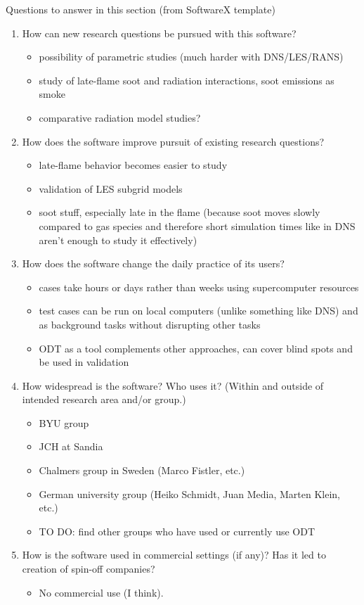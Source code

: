 \documentclass[preprint,12pt, a4paper]{elsarticle}
\begin{document}
Questions to answer in this section (from SoftwareX template)
\begin{enumerate}
	\item How can new research questions be pursued with this software?
		\begin{itemize}
			\item possibility of parametric studies (much harder with DNS/LES/RANS)
			\item study of late-flame soot and radiation interactions, soot emissions as smoke
			\item comparative radiation model studies?
		\end{itemize}
	\item How does the software improve pursuit of existing research questions?
		\begin{itemize}
			\item late-flame behavior becomes easier to study
			\item validation of LES subgrid models
			\item soot stuff, especially late in the flame (because soot moves slowly compared to gas species and therefore short simulation times like in DNS aren't enough to study it effectively)
		\end{itemize}
	\item How does the software change the daily practice of its users?
		\begin{itemize}
			\item cases take hours or days rather than weeks using supercomputer resources
			\item test cases can be run on local computers (unlike something like DNS) and as background tasks without disrupting other tasks
			\item ODT as a tool complements other approaches, can cover blind spots and be used in validation
		\end{itemize}
	\item How widespread is the software? Who uses it? (Within and outside of intended research area and/or group.)
		\begin{itemize}
			\item BYU group
			\item JCH at Sandia
			\item Chalmers group in Sweden (Marco Fistler, etc.)
			\item German university group (Heiko Schmidt, Juan Media, Marten Klein, etc.)
			\item TO DO: find other groups who have used or currently use ODT
		\end{itemize}
	\item How is the software used in commercial settings (if any)? Has it led to creation of spin-off companies?
		\begin{itemize}
			\item No commercial use (I think). 
		\end{itemize}
\end{enumerate}
\end{document}
